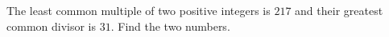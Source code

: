The least common multiple of two positive integers is $217$ and their greatest common divisor is $31$. Find the two numbers.
